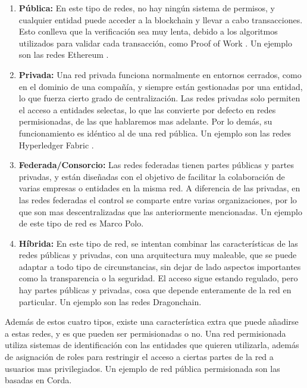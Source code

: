 \begin{enumerate}
\item \textbf{Pública:} En este tipo de redes, no hay ningún sistema de permisos, y cualquier entidad puede acceder a la blockchain y llevar a cabo transacciones. Esto conlleva que la verificación sea muy lenta, debido a los algoritmos utilizados para validar cada transacción, como Proof of Work \cite{POW}. Un ejemplo son las redes Ethereum \cite{ethereum}.
\item \textbf{Privada:} Una red privada funciona normalmente en entornos cerrados, como en el dominio de una compañía, y siempre están gestionadas por una entidad, lo que fuerza cierto grado de centralización. Las redes privadas solo permiten el acceso a entidades selectas, lo que las convierte por defecto en redes permisionadas, de las que hablaremos mas adelante. Por lo demás, su funcionamiento es idéntico al de una red pública. Un ejemplo son las redes Hyperledger Fabric \cite{fabric}.
\item \textbf{Federada/Consorcio:} Las redes federadas tienen partes públicas y partes privadas, y están diseñadas con el objetivo de facilitar la colaboración de varias empresas o entidades en la misma red. A diferencia de las privadas, en las redes federadas el control se comparte entre varias organizaciones, por lo que son mas descentralizadas que las anteriormente mencionadas. Un ejemplo de este tipo de red es Marco Polo.
\item \textbf{Híbrida:} En este tipo de red, se intentan combinar las características de las redes públicas y privadas, con una arquitectura muy maleable, que se puede adaptar a todo tipo de circunstancias, sin dejar de lado aspectos importantes como la transparencia o la seguridad. El acceso sigue estando regulado, pero hay partes públicas y privadas, cosa que depende enteramente de la red en particular. Un ejemplo son las redes Dragonchain.
\end{enumerate}

Además de estos cuatro tipos, existe una característica extra que puede añadirse a estas redes, y es que pueden ser permisionadas o no. Una red permisionada utiliza sistemas de identificación con las entidades que quieren utilizarla, además de asignación de roles para restringir el acceso a ciertas partes de la red a usuarios mas privilegiados. Un ejemplo de red pública permisionada son las basadas en Corda.

